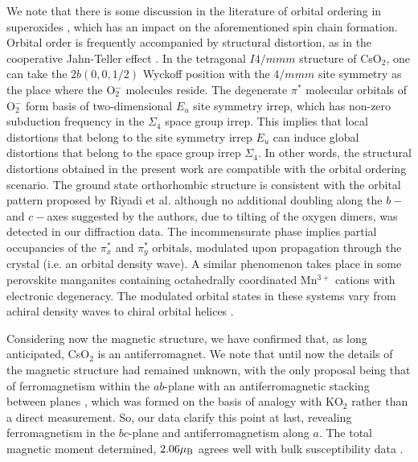 \documentclass[prb,aps,twocolumn,superscriptaddress,showpacs,footinbib]{revtex4-2}
\newcommand{\cso}{CsO$_{2}$ }
\begin{document}
We note that there is some discussion in the literature of orbital ordering in superoxides \cite{Klanjsek2015,Knaflic2015,Nandy2010,Kim2010,Kim2014}, which has an impact on the aforementioned spin chain formation. Orbital order is frequently accompanied by structural distortion, as in the cooperative Jahn-Teller effect \cite{Kanamori-coopJT-1960}. In the tetragonal $I4/mmm$ structure of CsO$_2$, one can take the $2b(0,0,1/2)$ Wyckoff position with the $4/mmm$ site symmetry as the place where the O$_{2}^{-}$ molecules reside. The degenerate $\pi^*$ molecular orbitals of O$_{2}^{-}$ form basis of two-dimensional $E_u$ site symmetry irrep, which has non-zero subduction frequency in the $\Sigma_4$ space group irrep. This implies that local distortions that belong to the site symmetry irrep $E_u$ can induce global distortions that belong to the space group irrep $\Sigma_4$. In other words, the structural distortions obtained in the present work are compatible with the orbital ordering scenario. The ground state orthorhombic structure is consistent with the orbital pattern proposed by Riyadi et al. \cite{Riyadi2012} although no additional doubling along the $b-$ and $c-$axes suggested by the authors, due to tilting of the oxygen dimers, was detected in our diffraction data. The incommensurate phase implies partial occupancies of the $\pi_x^*$ and $\pi_y^*$ orbitals, modulated upon propagation through the crystal (i.e. an orbital density wave). A similar phenomenon takes place in some perovskite manganites containing octahedrally coordinated Mn$^{3+}$ cations with electronic degeneracy. The modulated orbital states in these systems vary from achiral density waves \cite{Perks2012} to chiral orbital helices \cite{Khalyavin2020}.

Considering now the magnetic structure, we have confirmed that, as long anticipated, \cso is an antiferromagnet. We note that until now the details of the magnetic structure had remained unknown, with the only proposal being that of ferromagnetism within the $ab$-plane with an antiferromagnetic stacking between planes \cite{Labhart}, which was formed on the basis of analogy with KO$_{2}$ \cite{Smith1966} rather than a direct measurement. So, our data clarify this point at last, revealing ferromagnetism in the $bc$-plane and antiferromagnetism along $a$. The total magnetic moment determined, $2.06\mu_{\rm{B}}$ agrees well with bulk susceptibility data \cite{Riyadi2012,Miyajima2018}.
\end{document}
